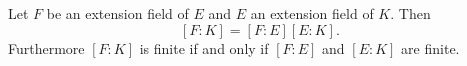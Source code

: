 Let $F$ be an extension field of $E$ and $E$ an extension field of $K$. Then
$$[F : K] = [F : E][E : K].$$
Furthermore $[F : K]$ is finite if and only if $[F : E]$ and $[E : K]$ are finite.
